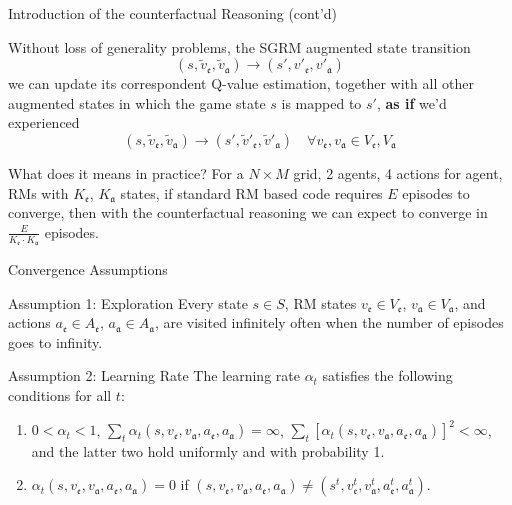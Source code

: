 \documentclass[10pt, aspectratio=169]{beamer}
\newcommand{\evidenzia}[1]{\textcolor{verdeSalvia}{\textbf{#1}}}
\begin{document}
\begin{frame}{Introduction of the counterfactual Reasoning (cont'd)}

    Without loss of generality problems, the SGRM augmented state transition 
    $$(s, \tilde v_{\mathfrak{e}},\tilde v_{\mathfrak{a}}) \rightarrow (s',  v'_{\mathfrak{e}}, v'_{\mathfrak{a}})$$
    we can update its correspondent Q-value estimation, together with all other augmented states in which the game state $s$ is mapped to $s'$, \evidenzia{as if} we'd experienced
    $$(s, \tilde v_{\mathfrak{e}},\tilde v_{\mathfrak{a}}) \rightarrow (s', \tilde v'_{\mathfrak{e}},\tilde v'_{\mathfrak{a}}) \quad \forall v_{\mathfrak{e}}, v_{\mathfrak{a}} \in V_{\mathfrak{e}}, V_{\mathfrak{a}}$$
    
    \begin{block}{What does it means in practice?}
    For a $N\times M$ grid, 2 agents, 4 actions for agent, RMs with $K_\mathfrak{e}$, $K_\mathfrak{a}$ states, if standard RM based code requires $E$ episodes to converge, then with the counterfactual reasoning we can expect to converge in $\frac{E}{K_\mathfrak{e} \cdot K_\mathfrak{a}}$ episodes.
    \end{block}

\end{frame}

\begin{frame}{Convergence Assumptions}
    \begin{block}{Assumption 1: Exploration}
        Every state $s \in S$, RM states $v_{\mathfrak{e}} \in V_{\mathfrak{e}}$, $v_{\mathfrak{a}} \in V_{\mathfrak{a}}$, and actions $a_{\mathfrak{e}} \in A_{\mathfrak{e}}$, $a_{\mathfrak{a}} \in A_{\mathfrak{a}}$, are visited infinitely often when the number of episodes goes to infinity. 
    \end{block}
    \begin{block}{Assumption 2: Learning Rate}
        The learning rate $\alpha_t$ satisfies the following conditions for all $t$:
        \begin{enumerate}
            \item $0 < \alpha_t < 1$, $\sum_t \alpha_t(s, v_{\mathfrak{e}}, v_{\mathfrak{a}}, a_{\mathfrak{e}}, a_{\mathfrak{a}}) = \infty$, $\sum_t [\alpha_t(s, v_{\mathfrak{e}}, v_{\mathfrak{a}}, a_{\mathfrak{e}}, a_{\mathfrak{a}})]^2 < \infty$, and the latter two hold uniformly and with probability 1. 
            \item $\alpha_t(s, v_{\mathfrak{e}}, v_{\mathfrak{a}}, a_{\mathfrak{e}}, a_{\mathfrak{a}}) = 0$ if $(s, v_{\mathfrak{e}}, v_{\mathfrak{a}}, a_{\mathfrak{e}}, a_{\mathfrak{a}}) \neq (s^t, v_{\mathfrak{e}}^t, v_{\mathfrak{a}}^t, a_{\mathfrak{e}}^t, a_{\mathfrak{a}}^t)$.
        \end{enumerate}
    \end{block}
\end{frame}
\end{document}
